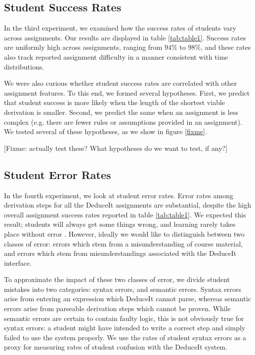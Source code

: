 \documentclass{sigchi}
\begin{document}
\subsection{Student Success Rates}

In the third experiment, we examined how the success rates of students vary across assignments. Our results are displayed in table \ref{tab:table1}. Success rates are uniformly high across assignments, ranging from $94\%$ to $98\%$, and these rates also track reported assignment difficulty in a manner consistent with time distributions.

We were also curious whether student success rates are correlated with other assignment features. To this end, we formed several hypotheses. First, we predict that student success is more likely when the length of the shortest viable derivation is smaller. Second, we predict the same when an assignment is less complex (e.g. there are fewer rules or assumptions provided in an assignment). We tested several of these hypotheses, as we show in figure \ref{fixme}.

[Fixme: actually test these? What hypotheses do we want to test, if any?]

\subsection{Student Error Rates}

In the fourth experiment, we look at student error rates. Error rates among derivation steps for all the DeduceIt assignments are substantial, despite the high overall assignment success rates reported in table \ref{tab:table1}. We expected this result; students will always get some things wrong, and learning rarely takes place without error \cite{fixme}. However, ideally we would like to distinguish between two classes of error: errors which stem from a misunderstanding of course material, and errors which stem from misunderstandings associated with the DeduceIt interface.

To approximate the impact of these two classes of error, we divide student mistakes into two categories: syntax errors, and semantic errors. Syntax errors arise from entering an expression which DeduceIt cannot parse, whereas semantic errors arise from parseable derivation steps which cannot be proven. While semantic errors are certain to contain faulty logic, this is not obviously true for syntax errors: a student might have intended to write a correct step and simply failed to use the system properly. We use the rates of student syntax errors as a proxy for measuring rates of student confusion with the DeduceIt system.
\end{document}
